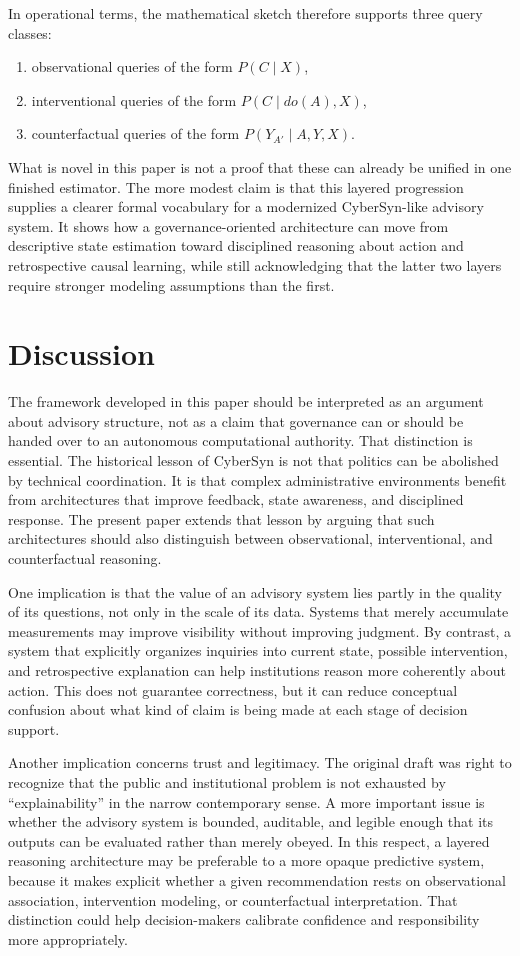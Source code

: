 \documentclass[11pt]{article}
\begin{document}
In operational terms, the mathematical sketch therefore supports three query classes:
\begin{enumerate}
\item observational queries of the form $P(C \mid X)$,
\item interventional queries of the form $P(C \mid do(A), X)$,
\item counterfactual queries of the form $P(Y_{A'} \mid A, Y, X)$.
\end{enumerate}
What is novel in this paper is not a proof that these can already be unified in one finished estimator. The more modest claim is that this layered progression supplies a clearer formal vocabulary for a modernized CyberSyn-like advisory system. It shows how a governance-oriented architecture can move from descriptive state estimation toward disciplined reasoning about action and retrospective causal learning, while still acknowledging that the latter two layers require stronger modeling assumptions than the first.

\section{Discussion}

The framework developed in this paper should be interpreted as an argument about advisory structure, not as a claim that governance can or should be handed over to an autonomous computational authority. That distinction is essential. The historical lesson of CyberSyn is not that politics can be abolished by technical coordination. It is that complex administrative environments benefit from architectures that improve feedback, state awareness, and disciplined response. The present paper extends that lesson by arguing that such architectures should also distinguish between observational, interventional, and counterfactual reasoning.

One implication is that the value of an advisory system lies partly in the quality of its questions, not only in the scale of its data. Systems that merely accumulate measurements may improve visibility without improving judgment. By contrast, a system that explicitly organizes inquiries into current state, possible intervention, and retrospective explanation can help institutions reason more coherently about action. This does not guarantee correctness, but it can reduce conceptual confusion about what kind of claim is being made at each stage of decision support.

Another implication concerns trust and legitimacy. The original draft was right to recognize that the public and institutional problem is not exhausted by ``explainability'' in the narrow contemporary sense. A more important issue is whether the advisory system is bounded, auditable, and legible enough that its outputs can be evaluated rather than merely obeyed. In this respect, a layered reasoning architecture may be preferable to a more opaque predictive system, because it makes explicit whether a given recommendation rests on observational association, intervention modeling, or counterfactual interpretation. That distinction could help decision-makers calibrate confidence and responsibility more appropriately.
\end{document}
